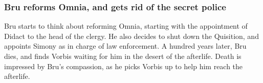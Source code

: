 \subsubsection{\Gls{Bru} reforms Omnia, and gets rid of the secret police}
\Gls{Bru} starts to think about reforming Omnia, starting with the appointment of \Gls{Didact} to
the head of the clergy. He also decides to shut down the Quisition, and appoints \Gls{Simony} as
in charge of law enforcement. A hundred years later, \Gls{Bru} dies, and finds \Gls{Vorbis} waiting
for him in the desert of the afterlife. \Gls{Death} is impressed by \Gls{Bru}'s compassion, as he
picks \Gls{Vorbis} up to help him reach the afterlife.